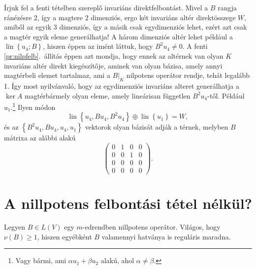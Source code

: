 \documentclass[9pt, a4paper, showtrims]{memoir}
\theoremstyle{plain}
\theoremstyle{remark}
\theoremstyle{definition}
\DeclareMathOperator{\lin}{lin}
\begin{document}
Írjuk fel a fenti tételben szereplő invariáns direktfelbontást.
Mivel a $B$ rangja ránézésre 2, így a magtere 2 dimenziós, ergo két invariáns altér direktösszege $W$, amiből
az egyik 3 dimenziós, így a másik csak egydimenziós lehet, ezért azt csak a magtér egyik eleme generálhatja!
A három dimenziós altér lehet például a $\lin\left\{ u_4;B \right\}$, 
hiszen éppen az imént láttuk, hogy $B^2u_4\neq 0$.
A fenti \ref{pr:nilpfelb}.~állítás éppen azt mondja, hogy ennek az altérnek van olyan $K$ invariáns altér direkt kiegészítője, 
aminek van olyan bázisa, amely annyi magtérbeli elemet tartalmaz, ami a $B|_K$ nilpotens operátor rendje, tehát legalább 1.
Így most nyilvánvaló, hogy az
egydimenziós invariáns alteret generálhatja a $\ker A$ magtérbármely olyan eleme,
amely lineárisan független $B^2u_4$-től.
Például $u_1$.\footnote{Vagy bármi, ami $\alpha u_1+\beta u_2$ alakú, ahol $\alpha\neq\beta$.}
Ilyen módon
\[
    \lin\left\{ u_4,Bu_4,B^2u_4 \right\}\oplus
    \lin\left\{ u_1 \right\}
    =
    W,
\]
és az 
\(
\left\{ 
    B^2u_4,Bu_4,u_4,u_1
\right\}
\)
vektorok olyan bázisát adják a térnek, melyben $B$ mátrixa az alábbi alakú
\[
    \begin{pmatrix}
        0&1&0&0\\
        0&0&1&0\\
        0&0&0&0\\
        0&0&0&0
    \end{pmatrix}.
\]
\section{A nillpotens felbontási tétel nélkül?}
Legyen $B\in L\left( V \right)$ egy $m$-edrendben nillpotens operátor.
Világos, hogy $\nu\left( B \right)\geq 1$, 
hiszen egyébként $B$ valamennyi hatványa is reguláris maradna.
\end{document}

